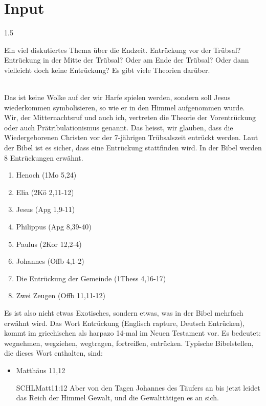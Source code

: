 \documentclass[14pt]{../../inc/mybib}
\begin{document}
\section{ Input }
\begin{spacing}{1.5}
    \begin{block}
        Ein viel diskutiertes Thema über die Endzeit. Entrückung vor der Trübsal? Entrückung in der Mitte der Trübsal? Oder am Ende der Trübsal? Oder dann vielleicht doch keine Entrückung? Es gibt viele Theorien darüber.

        \\
        Das ist keine Wolke auf der wir Harfe spielen werden, sondern soll Jesus wiederkommen symbolisieren, so wie er in den Himmel aufgenommen wurde.
        \\
        Wir, der Mitternachtsruf und auch ich, vertreten die Theorie der Vorentrückung oder auch Prätribulationismus genannt. Das heisst, wir glauben, dass die Wiedergeborenen Christen vor der 7-jährigen Trübsalszeit entrückt werden. Laut der Bibel ist es sicher, dass eine Entrückung stattfinden wird. In der Bibel werden 8 Entrückungen erwähnt.
        \begin{enumerate}
            \item Henoch (1Mo 5,24)
            \item Elia (2Kö 2,11-12)
            \item Jesus (Apg 1,9-11)
            \item Philippus (Apg 8,39-40)
            \item Paulus (2Kor 12,2-4)
            \item Johannes (Offb 4,1-2)
            \item Die Entrückung der Gemeinde (1Thess 4,16-17)
            \item Zwei Zeugen (Offb 11,11-12)
        \end{enumerate}
        Es ist also nicht etwas Exotisches, sondern etwas, was in der Bibel mehrfach erwähnt wird. Das Wort Entrückung (Englisch rapture, Deutsch Entrücken), kommt im griechischen als harpazo 14-mal im Neuen Testament vor. Es bedeutet: wegnehmen, wegziehen, wegtragen, fortreißen, entrücken.
        Typische Bibelstellen, die dieses Wort enthalten, sind:
        \begin{itemize}
            \item Matthäus 11,12
                  \begin{bibelbox}{SCHL}{Matt}{11:12}
                      Aber von den Tagen Johannes des Täufers an bis jetzt leidet das Reich der Himmel Gewalt, und die Gewalttätigen  es an sich.

\end{bibelbox}
\end{itemize}
\end{block}
\end{spacing}
\end{document}
